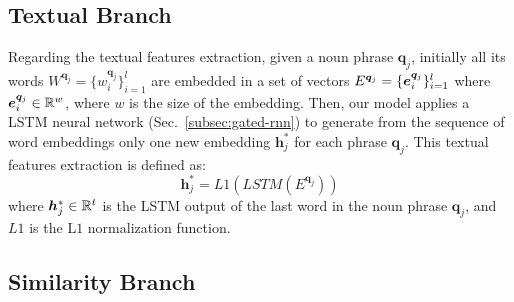 \subsection{Textual Branch}
\label{subsec:textual-branch}

Regarding the textual features extraction, given a noun phrase
$\bm{q}_j$, initially all its words $W^{\bm{q}_j} = \{ w^{\bm{q}_j}_i
\}^l_{i=1}$ are embedded in a set of vectors $E^{\bm{q}_j} = \{ \bm{e}^{\bm{q}_j}_i
\}^l_{i=1}$ where $\bm{e}^{\bm{q}_j}_i \in \mathbb{R}^w$, where $w$ is the size of the
embedding. Then, our model applies a LSTM neural network
(Sec.~\ref{subsec:gated-rnn}) to generate from the sequence of word
embeddings only one new embedding $\bm{h}^*_j$ for each phrase
$\bm{q}_j$. This textual features extraction is defined as:
\begin{equation}
  \bm{h}^*_j = L1(LSTM(E^{\bm{q}_j}))
  \label{eq:h-star}
\end{equation}
where $\bm{h}^*_j \in \mathbb{R}^t$ is the LSTM output of the last word in
the noun phrase $\bm{q}_j$, and $L1$ is the L$1$ normalization
function.

\subsection{Similarity Branch}
\label{subsec:similarity-branch}

